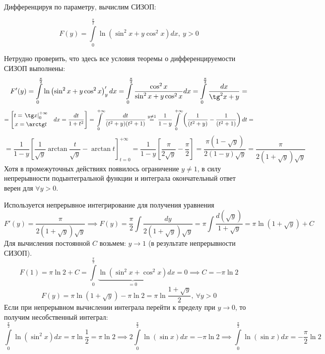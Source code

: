 \documentclass[../../main.tex]{subfiles}
\begin{document}
\begin{example}
    Дифференцируя по параметру, вычислим СИЗОП:

    \[F(y) = \int\limits_0^{\frac{\pi}{2}} \ln
    \left( \sin^2 x + y \cos^2 x \right) dx, \ y > 0\]

    Нетрудно проверить, что здесь все условия теоремы о дифференцируемости 
    СИЗОП
    выполнены:
    \[ F'(y) = \int\limits_0^{\frac{\pi}{2}} \ln
    \left( \sin^2 x + y \cos^2 x \right)'_y dx = 
    \int\limits_0^{\frac{\pi}{2}} \dfrac{\cos^2 x}{\sin^2 x + y \cos^2 x} dx =
    \int\limits_0^{\frac{\pi}{2}} \dfrac{dx}{\tg^2 x  + y} = \]
    \[ = \left[
    \begin{gathered}
        t = \left. \tg x \right|_0^{+\infty} \\
        x = \arctan t
    \end{gathered} \ \ \
    dx = \dfrac{dt}{1 + t^2}
    \right] = \int\limits_0^{+\infty} \dfrac{dt}{(t^2 + y)(t^2 + 1)}
    \overset{y \neq 1}{=}
    \dfrac{1}{1-y} \int\limits_0^{+\infty} \left( \dfrac{1}{(t^2 + y)} -
    \dfrac{1}{(t^2 + 1)} \right) dt = \]
    \[ = \dfrac{1}{1 - y} \left[ \dfrac{1}{\sqrt{y}} \arctan 
    \dfrac{t}{\sqrt{y}}
    - \arctan t \right]_{t = 0}^{+\infty} = \dfrac{1}{1 - y}
    \left[ \dfrac{\pi}{2 \sqrt{y}}
    - \dfrac{\pi}{2} \right] = \dfrac{\pi (1 - \sqrt{y})}{2 (1 - y) \sqrt{y}} =
    \dfrac{\pi}{2 (1 + \sqrt{y}) \sqrt{y}} \]
    Хотя в промежуточных действиях появилось ограничение $y \neq 1$,
    в силу непрерывности
    подынтегральной функции и интеграла окончательный ответ верен для
    $\forall y > 0$.

    Используется непрерывное интегрирование для получения уравнения
    \[F'(y) = \dfrac{\pi}{2(1+\sqrt{y})\sqrt{y}} \implies F(y) =
    \dfrac{\pi}{2} \int \dfrac{dy}{2 (1 + \sqrt{y}) \sqrt{y}}  = \pi
    \int \dfrac{d(\sqrt{y})}{1 + \sqrt{y}} = \pi \ln (1 + \sqrt{y}) + C \]
    Для вычисления постоянной $C$ возьмем: $y \to 1$ (в результате
    непрерывности СИЗОП).
    \[F(1) = \pi \ln 2 + C = \int\limits_0^{\frac{\pi}{2}}
    \underbrace{ \ln \left( \sin^2 x + \cos^2 x \right)}_{= 0} dx = 0
    \implies C = -\pi \ln 2\]
    \[F(y) = \pi \ln(1 + \sqrt{y}) - \pi \ln 2 =
    \pi \ln \dfrac{1 + \sqrt{y}}{2}, \ \forall y > 0\]
    Если при непрерывном вычислении интеграла перейти к пределу при $y \to 0$,
    то получим несобственный интеграл:
    \[ \int\limits_0^{\frac{\pi}{2}} \ln (\sin^2 x)dx = \pi \ln \dfrac{1}{2} =
    \pi \ln 2 \implies 2 \int\limits_0^{\frac{\pi}{2}} \ln (\sin x) dx = 
    - \pi \ln 2 \implies \int\limits_0^{\frac{\pi}{2}} \ln (\sin x) dx = 
    - \dfrac{\pi}{2}\ln 2\]
    
\end{example}
\end{document}
